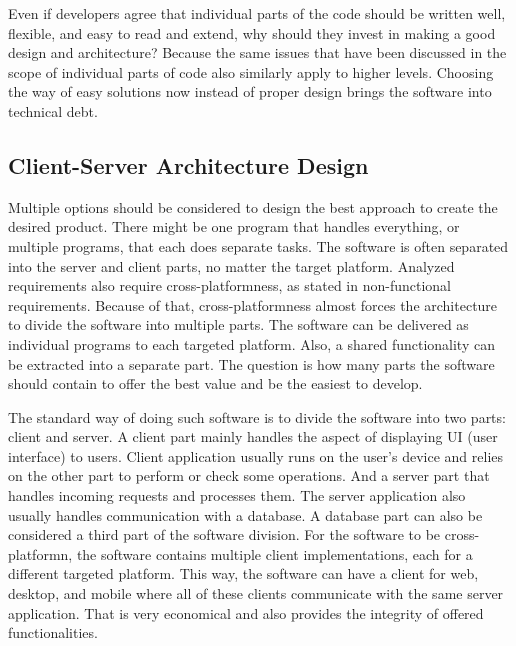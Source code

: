 Even if developers agree that individual parts of the code should be written well, flexible, and easy to read and extend, why should they invest in making a good design and architecture?
Because the same issues that have been discussed in the scope of individual parts of code also similarly apply to higher levels.
Choosing the way of easy solutions now instead of proper design brings the software into technical debt. 

\subsection{Client-Server Architecture Design}

Multiple options should be considered to design the best approach to create the desired product.
There might be one program that handles everything, or multiple programs, that each does separate tasks.
The software is often separated into the server and client parts, no matter the target platform.
Analyzed requirements also require cross-platformness, as stated in non-functional requirements.
Because of that, cross-platformness almost forces the architecture to divide the software into multiple parts.
The software can be delivered as individual programs to each targeted platform.
Also, a shared functionality can be extracted into a separate part.
The question is how many parts the software should contain to offer the best value and be the easiest to develop.

The standard way of doing such software is to divide the software into two parts: client and server.
A client part mainly handles the aspect of displaying UI (user interface) to users.
Client application usually runs on the user's device and relies on the other part to perform or check some operations.
And a server part that handles incoming requests and processes them.
The server application also usually handles communication with a database.
A database part can also be considered a third part of the software division.
For the software to be cross-platformn, the software contains multiple client implementations, each for a different targeted platform.
This way, the software can have a client for web, desktop, and mobile where all of these clients communicate with the same server application.
That is very economical and also provides the integrity of offered functionalities.

